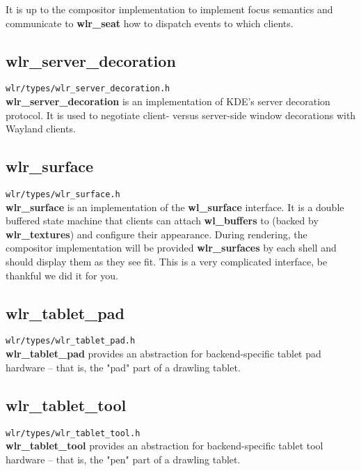 \documentclass{article}
\newcommand{\code}[1]{\texttt{#1}}
\begin{document}
It is up to the compositor implementation to implement focus semantics and
communicate to \textbf{wlr_seat} how to dispatch events to which clients.

\subsection{wlr_server_decoration}\label{wlr server decoration}

\code{wlr/types/wlr_server_decoration.h}\\

\textbf{wlr_server_decoration} is an implementation of KDE's server decoration
protocol. It is used to negotiate client- versus server-side window decorations
with Wayland clients.

\subsection{wlr_surface}\label{wlr surface}

\code{wlr/types/wlr_surface.h}\\

\textbf{wlr_surface} is an implementation of the \textbf{wl_surface} interface.
It is a double buffered state machine that clients can attach
\textbf{wl_buffers} to (backed by \textbf{wlr_textures}) and configure their
appearance. During rendering, the compositor implementation will be provided
\textbf{wlr_surfaces} by each shell and should display them as they see fit.
This is a very complicated interface, be thankful we did it for you.

\subsection{wlr_tablet_pad}\label{wlr tablet pad}

\code{wlr/types/wlr_tablet_pad.h}\\

\textbf{wlr_tablet_pad} provides an abstraction for backend-specific tablet pad
hardware -- that is, the "pad" part of a drawling tablet.

\subsection{wlr_tablet_tool}\label{wlr tablet tool}

\code{wlr/types/wlr_tablet_tool.h}\\

\textbf{wlr_tablet_tool} provides an abstraction for backend-specific tablet
tool hardware -- that is, the "pen" part of a drawling tablet.
\end{document}
